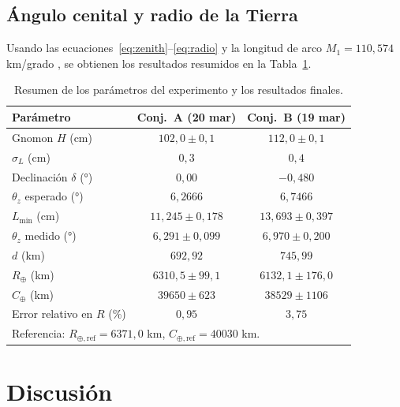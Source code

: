 \documentclass[stu,12pt,floatsintext]{apa7}
\begin{document}
\subsection{Ángulo cenital y radio de la Tierra}

Usando las ecuaciones~\eqref{eq:zenith}–\eqref{eq:radio} y la longitud de arco
$M_1 = 110{,}574$ km/grado \parencite{nga_wgs84}, se obtienen los resultados
resumidos en la Tabla~\ref{tab:resultados}.

\begin{table}[h]
    \caption{Resumen de los parámetros del experimento y los resultados finales.}
    \label{tab:resultados}
    \centering
    \small
    \begin{tabular}{lcc}
        \toprule
        \textbf{Parámetro} & \textbf{Conj.~A (20 mar)} & \textbf{Conj.~B (19 mar)} \\
        \midrule
        Gnomon $H$ (cm)           & $102{,}0 \pm 0{,}1$ & $112{,}0 \pm 0{,}1$ \\
        $\sigma_L$ (cm)           & $0{,}3$             & $0{,}4$              \\
        Declinación $\delta$ (°)  & $0{,}00$            & $-0{,}480$           \\
        $\theta_z$ esperado (°)   & $6{,}2666$          & $6{,}7466$           \\
        $L_{\min}$ (cm)           & $11{,}245 \pm 0{,}178$ & $13{,}693 \pm 0{,}397$ \\
        $\theta_z$ medido (°)     & $6{,}291 \pm 0{,}099$  & $6{,}970 \pm 0{,}200$ \\
        $d$ (km)                  & $692{,}92$          & $745{,}99$           \\
        $R_\oplus$ (km)           & $6310{,}5 \pm 99{,}1$ & $6132{,}1 \pm 176{,}0$ \\
        $C_\oplus$ (km)           & $39650 \pm 623$     & $38529 \pm 1106$     \\
        Error relativo en $R$ (\%) & $0{,}95$           & $3{,}75$             \\
        \bottomrule
        \multicolumn{3}{l}{\footnotesize Referencia: $R_{\oplus,\text{ref}} = 6371{,}0$ km,
                            $C_{\oplus,\text{ref}} = 40030$ km.} \\
    \end{tabular}
\end{table}

\section{Discusión}
\end{document}
